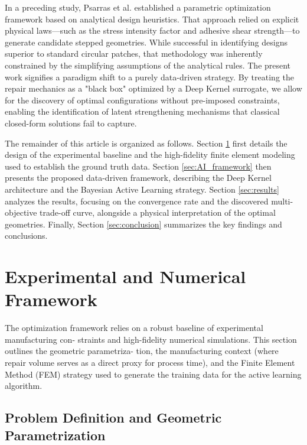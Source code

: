 \documentclass[
  preprint,
  12pt,
  a4paper
]{elsarticle}
\newcommand{\new}[1]{#1}
\begin{document}
In a preceding study, Psarras et al. \cite{psarras2024design} established a parametric optimization framework based on analytical design heuristics. That approach relied on explicit physical laws—such as the stress intensity factor and adhesive shear strength—to generate candidate stepped geometries. While successful in identifying designs superior to standard circular patches, that methodology was inherently constrained by the simplifying assumptions of the analytical rules. The present work signifies a paradigm shift to a purely data-driven strategy. By treating the repair mechanics as a "black box" optimized by a \new{Deep Kernel surrogate}, we allow for the discovery of optimal configurations without pre-imposed constraints, enabling the identification of latent strengthening mechanisms that classical closed-form solutions fail to capture.

The remainder of this article is organized as follows. Section \ref{sec:methodology} first details the design of the experimental baseline and the high-fidelity finite element modeling used to establish the ground truth data. Section \ref{sec:AI_framework} then presents the proposed data-driven framework, describing the Deep Kernel architecture and the Bayesian Active Learning strategy. Section \ref{sec:results} analyzes the results, focusing on the \new{convergence rate} and the discovered multi-objective trade-off curve, alongside a physical interpretation of the optimal geometries. Finally, Section \ref{sec:conclusion} summarizes the key findings and conclusions.


\section{Experimental and Numerical Framework}
\label{sec:methodology}
The optimization framework relies on a robust baseline of experimental manufacturing con- straints and high-fidelity numerical simulations. This section outlines the geometric parametriza- tion, the manufacturing context (where repair volume serves as a direct proxy for process time), and the Finite Element Method (FEM) strategy used to generate the training data for the active learning algorithm.

\subsection{Problem Definition and Geometric Parametrization}
\end{document}
